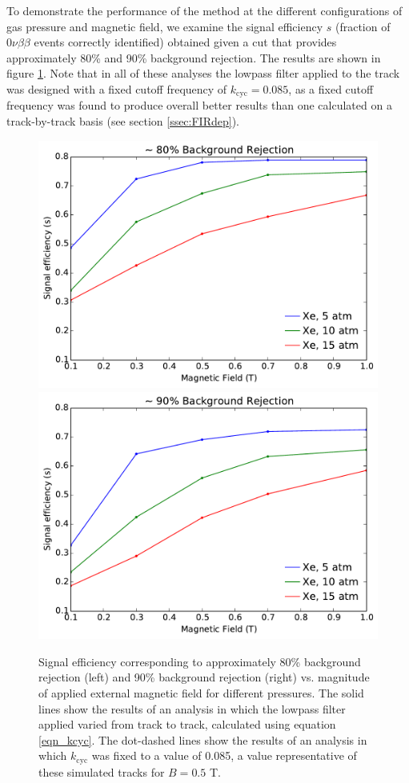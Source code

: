 \documentclass{JINST}
\begin{document}
To demonstrate the performance of the method at the different configurations of gas pressure and magnetic 
field, we examine the signal efficiency $s$ (fraction of $0\nu\beta\beta$ events correctly identified) obtained 
given a cut that provides approximately 80\% and 90\% background rejection.  The results are shown in figure 
\ref{fig_config}.  Note that in all of these analyses the lowpass filter applied to the track was designed with
a fixed cutoff frequency of $k_{\mathrm{cyc}} = 0.085$, as a fixed cutoff frequency was found to produce overall
better results than one calculated on a track-by-track basis (see section \ref{ssec:FIRdep}).

\begin{figure}[!htb]
	\centering
	\includegraphics[scale=0.43]{fig/eff_vs_b_80.pdf}
	\includegraphics[scale=0.43]{fig/eff_vs_b_90.pdf}
	\caption{\label{fig_config}Signal efficiency corresponding to approximately 80\% background rejection (left) and 90\% background rejection (right) vs. magnitude of applied external magnetic field for different pressures.  The solid lines show the results of an analysis in which the lowpass filter applied varied from track to track, calculated using equation \protect\ref{eqn_kcyc}.  The dot-dashed lines show the results of an analysis in which $k_{\mathrm{cyc}}$ was fixed to a value of 0.085, a value representative of these simulated tracks for $B = 0.5$ T.}  %
\end{figure}
\end{document}
